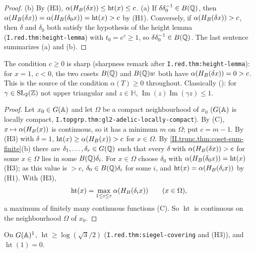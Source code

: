 \begin{theorem}
\end{theorem}
\begin{proof}
(b) By (H3), $\alpha(H_B(\delta x))\le\operatorname{ht}(x)\le c$. (a) If $\delta\delta_0^{-1}\in B(\mathbb{Q})$, then $\alpha(H_B(\delta x))=\alpha(H_B(\delta_0x))=
\operatorname{ht}(x)>c$ by (H1). Conversely, if $\alpha(H_B(\delta x))>c$, then $\delta$ and $\delta_0$ both satisfy the hypothesis of the height lemma
(\texttt{I.red.thm:height-lemma}) with $t_0=e^c\ge1$, so $\delta\delta_0^{-1}\in B(\mathbb{Q})$. The last sentence summarizes (a) and (b).
\end{proof}
\noindent The condition $c\ge0$ is sharp (sharpness remark after \texttt{I.red.thm:height-lemma}): for $x=1$, $c<0$, the two cosets $B(\mathbb{Q})$ and $B(\mathbb{Q})w$
both have $\alpha(H_B(\delta x))=0>c$. This is the source of the condition $\alpha(T)\ge0$ throughout. Classically
(\cite[Fig.~8.3]{AIntro}): for $\gamma\in\mathrm{SL}_2(\mathbb{Z})$ not upper triangular and $z\in\mathbb H$, $\operatorname{Im}(z)\operatorname{Im}(\gamma z)\le1$.

\begin{theorem}
\end{theorem}
\begin{proof}
Let $x_0\in G(\mathbb{A})$ and let $\Omega$ be a compact neighbourhood of $x_0$ ($G(\mathbb{A})$ is locally compact, \texttt{I.topgrp.thm:gl2-adelic-locally-compact}). By (C),
$x\mapsto\alpha(H_B(x))$ is continuous, so it has a minimum $m$ on $\Omega$; put $c=m-1$. By (H3) with $\delta=1$, $\operatorname{ht}(x)\ge\alpha(H_B(x))>c$
for $x\in\Omega$. By \cref{II.trunc.thm:coset-sum-finite}(b) there are $\delta_1,\dots,\delta_r\in G(\mathbb{Q})$ such that every $\delta$ with
$\alpha(H_B(\delta x))>c$ for some $x\in\Omega$ lies in some $B(\mathbb{Q})\delta_i$. For $x\in\Omega$ choose $\delta_0$ with $\alpha(H_B(\delta_0x))=\operatorname{ht}(x)$
(H3); as this value is $>c$, $\delta_0\in B(\mathbb{Q})\delta_i$ for some $i$, and $\operatorname{ht}(x)=\alpha(H_B(\delta_ix))$ by (H1). With (H3),
\[
  \operatorname{ht}(x)=\max_{1\le i\le r}\alpha(H_B(\delta_ix))\qquad(x\in\Omega),
\]
a maximum of finitely many continuous functions (C). So $\operatorname{ht}$ is continuous on the neighbourhood $\Omega$ of $x_0$.
\end{proof}
\noindent On $G(\mathbb{A})^1$, $\operatorname{ht}\ge\log(\sqrt3/2)$ (\texttt{I.red.thm:siegel-covering} and (H3)), and $\operatorname{ht}(1)=0$.
